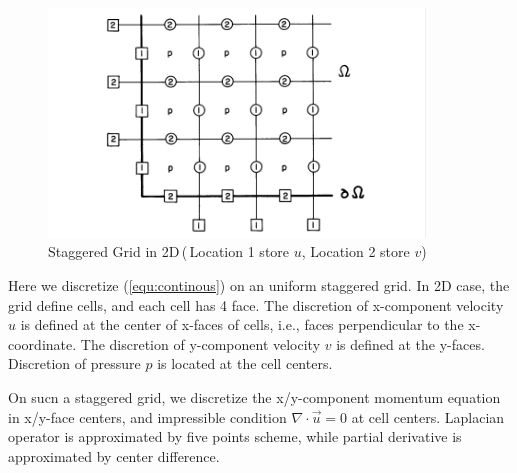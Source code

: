 \begin{figure}[ht]
    \centering
    \includegraphics[width=10cm]{pic/Staggered_grid.png}
    \caption{Staggered Grid in 2D\,(\,Location 1 store $u$, Location 2 store $v$)}
\end{figure} 

Here we discretize (\ref{equ:continous}) 
on an uniform staggered grid. In 2D case, the grid define cells, and
each cell has 4 face. The discretion of x-component velocity $u$ is 
defined at the center of x-faces of cells, i.e., faces perpendicular to the 
x-coordinate. The discretion of y-component velocity $v$ is defined at the y-faces.
Discretion of pressure $p$ is located at the cell centers.

On sucn a staggered grid, we discretize the x/y-component momentum equation in x/y-face centers, 
and impressible condition $\nabla \cdot \vec u =0$ at cell centers.
Laplacian operator is approximated by five points scheme, while partial
derivative is approximated by center difference.

